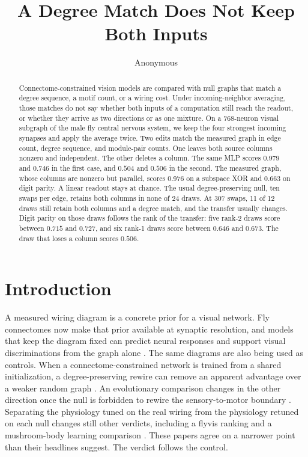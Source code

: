\documentclass[10pt,twocolumn,letterpaper]{article}
\title{A Degree Match Does Not Keep Both Inputs}
\author{Anonymous}
\begin{document}
\maketitle

\begin{abstract}
Connectome-constrained vision models are compared with null graphs that match a degree sequence, a motif count, or a wiring cost.
Under incoming-neighbor averaging, those matches do not say whether both inputs of a computation still reach the readout, or whether they arrive as two directions or as one mixture.
On a 768-neuron visual subgraph of the male fly central nervous system, we keep the four strongest incoming synapses and apply the average twice.
Two edits match the measured graph in edge count, degree sequence, and module-pair counts.
One leaves both source columns nonzero and independent.
The other deletes a column.
The same MLP scores $0.979$ and $0.746$ in the first case, and $0.504$ and $0.506$ in the second.
The measured graph, whose columns are nonzero but parallel, scores $0.976$ on a subspace XOR and $0.663$ on digit parity.
A linear readout stays at chance.
The usual degree-preserving null, ten swaps per edge, retains both columns in none of 24 draws.
At 307 swaps, 11 of 12 draws still retain both columns and a degree match, and the transfer usually changes.
Digit parity on those draws follows the rank of the transfer: five rank-2 draws score between $0.715$ and $0.727$, and six rank-1 draws score between $0.646$ and $0.673$.
The draw that loses a column scores $0.506$.
\end{abstract}

\section{Introduction}
\label{sec:intro}

A measured wiring diagram is a concrete prior for a visual network.
Fly connectomes now make that prior available at synaptic resolution, and models that keep the diagram fixed can predict neural responses and support visual discriminations from the graph alone \cite{lappalainen2024,dorkenwald2024,berg2026,correig2026}.
The same diagrams are also being used as controls.
When a connectome-constrained network is trained from a shared initialization, a degree-preserving rewire can remove an apparent advantage over a weaker random graph \cite{dhiman2026}.
An evolutionary comparison changes in the other direction once the null is forbidden to rewire the sensory-to-motor boundary \cite{park2026}.
Separating the physiology tuned on the real wiring from the physiology retuned on each null changes still other verdicts, including a flyvis ranking and a mushroom-body learning comparison \cite{liu2026}.
These papers agree on a narrower point than their headlines suggest.
The verdict follows the control.
\end{document}
